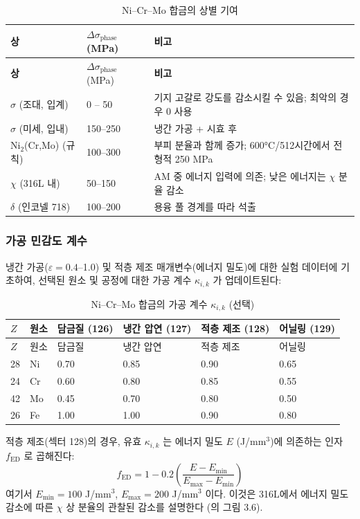 \documentclass[12pt,a4paper]{article}
\begin{document}
	\begin{longtable}{p{3.5cm} p{3.0cm} p{4.0cm}}
		\caption{Ni–Cr–Mo 합금의 상별 기여}\label{tab:nicrmo_phase_contrib}\\
		\toprule
		\textbf{상} & $\Delta\sigma_{\text{phase}}$ (MPa) & \textbf{비고} \\
		\midrule
		\endfirsthead
		\toprule
		\textbf{상} & $\Delta\sigma_{\text{phase}}$ (MPa) & \textbf{비고} \\
		\midrule
		\endhead
		$\sigma$ (조대, 입계) & 0 – 50 & 기지 고갈로 강도를 감소시킬 수 있음; 최악의 경우 0 사용 \\
		$\sigma$ (미세, 입내) & 150–250 & 냉간 가공 + 시효 후 \\
		Ni$_2$(Cr,Mo) (규칙) & 100–300 & 부피 분율과 함께 증가; 600°C/512시간에서 전형적 250 MPa \\
		$\chi$ (316L 내) & 50–150 & AM 중 에너지 입력에 의존; 낮은 에너지는 $\chi$ 분율 감소 \\
		$\delta$ (인코넬 718) & 100–200 & 용융 풀 경계를 따라 석출 \\
		\bottomrule
	\end{longtable}
	
	\subsubsection{가공 민감도 계수}
	냉간 가공($\varepsilon=0.4$–1.0) 및 적층 제조 매개변수(에너지 밀도)에 대한 실험 데이터에 기초하여, 선택된 원소 및 공정에 대한 가공 계수 $\kappa_{i,k}$ 가 업데이트된다:
	
	\begin{longtable}{p{1.5cm} p{1.2cm} p{1.8cm} p{1.8cm} p{1.8cm} p{1.8cm}}
		\caption{Ni–Cr–Mo 합금의 가공 계수 $\kappa_{i,k}$ (선택)}\label{tab:nicrmo_kappa_ik}\\
		\toprule
		$Z$ & 원소 & 담금질 (126) & 냉간 압연 (127) & 적층 제조 (128) & 어닐링 (129) \\
		\midrule
		\endfirsthead
		\toprule
		$Z$ & 원소 & 담금질 & 냉간 압연 & 적층 제조 & 어닐링 \\
		\midrule
		\endhead
		28 & Ni & 0.70 & 0.85 & 0.90 & 0.65 \\
		24 & Cr & 0.60 & 0.80 & 0.85 & 0.55 \\
		42 & Mo & 0.45 & 0.70 & 0.80 & 0.50 \\
		26 & Fe & 1.00 & 1.00 & 0.90 & 0.80 \\
		\bottomrule
	\end{longtable}
	
	적층 제조(섹터 128)의 경우, 유효 $\kappa_{i,k}$ 는 에너지 밀도 $E$ (J/mm$^3$)에 의존하는 인자 $f_{\text{ED}}$ 로 곱해진다:
	\[
	f_{\text{ED}} = 1 - 0.2\left(\frac{E - E_{\text{min}}}{E_{\text{max}} - E_{\text{min}}}\right)
	\]
	여기서 $E_{\text{min}}=100$ J/mm$^3$, $E_{\text{max}}=200$ J/mm$^3$ 이다. 이것은 316L에서 에너지 밀도 감소에 따른 $\chi$ 상 분율의 관찰된 감소를 설명한다 (\cite{dis2025}의 그림 3.6).
	
\end{document}
